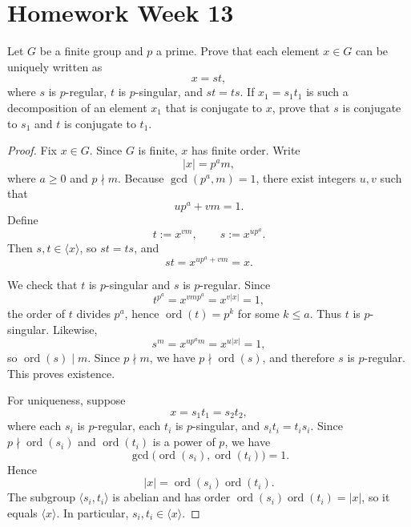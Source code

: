 \section{Homework Week 13}

\begin{exercise}
    Let \(G\) be a finite group and \(p\) a prime. Prove that each element \(x\in G\)
    can be uniquely written as
    \[
        x = st,
    \]
    where \(s\) is \(p\)-regular, \(t\) is \(p\)-singular, and \(st=ts\). If
    \(x_1=s_1t_1\) is such a decomposition of an element \(x_1\) that is conjugate to
    \(x\), prove that \(s\) is conjugate to \(s_1\) and \(t\) is conjugate to \(t_1\).
\end{exercise}

\begin{proof}
    Fix \(x\in G\). Since \(G\) is finite, \(x\) has finite order. Write
    \[
        |x|=p^a m,
    \]
    where \(a\geq 0\) and \(p\nmid m\). Because \(\gcd(p^a,m)=1\), there exist integers
    \(u,v\) such that
    \[
        up^a+vm=1.
    \]
    Define
    \[
        t:=x^{vm},
        \qquad
        s:=x^{up^a}.
    \]
    Then \(s,t\in \langle x\rangle\), so \(st=ts\), and
    \[
        st
        =
        x^{up^a+vm}
        =
        x.
    \]

    We check that \(t\) is \(p\)-singular and \(s\) is \(p\)-regular. Since
    \[
        t^{p^a}
        =
        x^{vmp^a}
        =
        x^{v|x|}
        =
        1,
    \]
    the order of \(t\) divides \(p^a\), hence \(\operatorname{ord}(t)=p^k\) for some
    \(k\leq a\). Thus \(t\) is \(p\)-singular. Likewise,
    \[
        s^m
        =
        x^{up^a m}
        =
        x^{u|x|}
        =
        1,
    \]
    so \(\operatorname{ord}(s)\mid m\). Since \(p\nmid m\), we have \(p\nmid
    \operatorname{ord}(s)\), and therefore \(s\) is \(p\)-regular. This proves existence.

    For uniqueness, suppose
    \[
        x=s_1t_1=s_2t_2,
    \]
    where each \(s_i\) is \(p\)-regular, each \(t_i\) is \(p\)-singular, and
    \(s_it_i=t_is_i\). Since \(p\nmid \operatorname{ord}(s_i)\) and
    \(\operatorname{ord}(t_i)\) is a power of \(p\), we have
    \[
        \gcd\bigl(\operatorname{ord}(s_i),\operatorname{ord}(t_i)\bigr)=1.
    \]
    Hence
    \[
        |x|
        =
        \operatorname{ord}(s_i)\operatorname{ord}(t_i).
    \]
    The subgroup \(\langle s_i,t_i\rangle\) is abelian and has order
    \(\operatorname{ord}(s_i)\operatorname{ord}(t_i)=|x|\), so it equals
    \(\langle x\rangle\). In particular, \(s_i,t_i\in \langle x\rangle\).


\end{proof}
